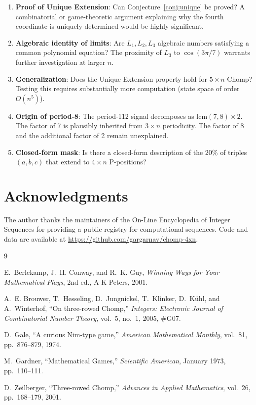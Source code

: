 \documentclass[12pt]{article}
\begin{document}
\begin{enumerate}
  \item \textbf{Proof of Unique Extension}: Can Conjecture~\ref{conj:unique}
        be proved? A combinatorial or game-theoretic argument explaining
        why the fourth coordinate is uniquely determined would be highly
        significant.

  \item \textbf{Algebraic identity of limits}: Are $L_1, L_2, L_3$
        algebraic numbers satisfying a common polynomial equation?
        The proximity of $L_3$ to $\cos(3\pi/7)$ warrants further
        investigation at larger $n$.

  \item \textbf{Generalization}: Does the Unique Extension property hold
        for $5 \times n$ Chomp? Testing this requires substantially more
        computation (state space of order $O(n^5)$).

  \item \textbf{Origin of period-8}: The period-112 signal decomposes
        as $\mathrm{lcm}(7,8) \times 2$. The factor of 7 is plausibly
        inherited from $3 \times n$ periodicity. The factor of 8 and the
        additional factor of 2 remain unexplained.

  \item \textbf{Closed-form mask}: Is there a closed-form description
        of the 20\% of triples $(a,b,c)$ that extend to $4 \times n$
        P-positions?
\end{enumerate}

\section*{Acknowledgments}

The author thanks the maintainers of the On-Line Encyclopedia of Integer
Sequences for providing a public registry for computational sequences.
Code and data are available at
\url{https://github.com/gargarnav/chomp-4xn}.

\begin{thebibliography}{9}

E.~Berlekamp, J.~H. Conway, and R.~K. Guy,
\textit{Winning Ways for Your Mathematical Plays}, 2nd ed.,
A K Peters, 2001.

A.~E. Brouwer, T.~Hesseling, D.~Jungnickel, T.~Klinker,
D.~K{\"u}hl, and A.~Winterhof,
``On three-rowed Chomp,''
\textit{Integers: Electronic Journal of Combinatorial Number Theory},
vol.~5, no.~1, 2005, \#G07.

D.~Gale,
``A curious Nim-type game,''
\textit{American Mathematical Monthly}, vol.~81, pp.~876--879, 1974.

M.~Gardner,
``Mathematical Games,''
\textit{Scientific American}, January 1973, pp.~110--111.

D.~Zeilberger,
``Three-rowed Chomp,''
\textit{Advances in Applied Mathematics}, vol.~26, pp.~168--179, 2001.

\end{thebibliography}
\end{document}
